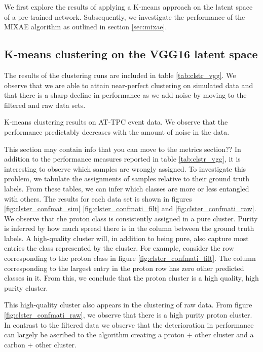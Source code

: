 \documentclass[review,number,sort&compress]{elsarticle}
\begin{document}
We first explore the results of applying a K-means approach on the latent space of a pre-trained network. Subsequently, we investigate the performance of the MIXAE algorithm as outlined in section \ref{sec:mixae}.

\subsection{K-means clustering on the VGG16 latent space}

The results of the clustering runs are included in table \ref{tab:clstr_vgg}. We observe that we are able to attain near-perfect clustering on simulated data and that there is a sharp decline in performance as we add noise by moving to the filtered and raw data sets. 


\begin{table}[H]
\centering 
\caption[K-means on pre-trained model]{K-means clustering results on AT-TPC event data. We observe that the performance predictably decreases with the amount of noise in the data.}\label{tab:clstr_vgg}

\end{table}

{\color{blue} This section may contain info that you can move to the metrics section??}
In addition to the performance measures reported in table \ref{tab:clstr_vgg}, it is interesting to observe which samples are wrongly assigned. To investigate this problem, we tabulate the assignments of samples relative to their ground truth labels. From these tables, we can infer which classes are more or less entangled with others. The results for each data set is shown in figures \ref{fig:clster_confmat_sim} \ref{fig:clster_confmati_filt} and \ref{fig:clster_confmati_raw}. We observe that the proton class is consistently assigned in a pure cluster. Purity is inferred by how much spread there is in the column between the ground truth labels. A high-quality cluster will, in addition to being pure, also capture most entries the class represented by the cluster. For example, consider the row corresponding to the proton class in figure \ref{fig:clster_confmati_filt}. The column corresponding to the largest entry in the proton row has zero other predicted classes in it. From this, we conclude that the proton cluster is a high quality, high purity cluster. 

This high-quality cluster also appears in the clustering of raw data. From figure \ref{fig:clster_confmati_raw}, we observe that there is a high purity proton cluster. In contrast to the filtered data we observe that the deterioration in performance can largely be ascribed to the algorithm creating a proton + other cluster and a carbon + other cluster.
\end{document}

